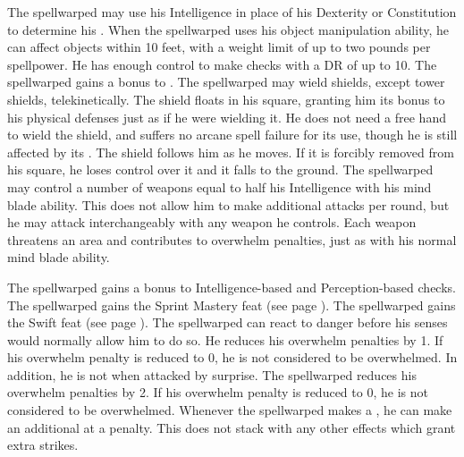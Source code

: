         The spellwarped may use his Intelligence in place of his Dexterity or Constitution to determine his .
        When the spellwarped uses his object manipulation ability, he can affect objects within 10 feet, with a weight limit of up to two pounds per spellpower.
        He has enough control to make checks with a DR of up to 10.
        The spellwarped gains a  bonus to .
        The spellwarped may wield shields, except tower shields, telekinetically.
        The shield floats in his square, granting him its bonus to his physical defenses just as if he were wielding it.
        He does not need a free hand to wield the shield, and suffers no arcane spell failure for its use, though he is still affected by its .
        The shield follows him as he moves.
        If it is forcibly removed from his square, he loses control over it and it falls to the ground.
        The spellwarped may control a number of weapons equal to half his Intelligence with his mind blade ability.
        This does not allow him to make additional attacks per round, but he may attack interchangeably with any weapon he controls.
        Each weapon threatens an area and contributes to overwhelm penalties, just as with his normal mind blade ability.

        The spellwarped gains a  bonus to Intelligence-based and Perception-based checks.
        The spellwarped gains the Sprint Mastery feat (see page ).
        The spellwarped gains the Swift feat (see page ).
        The spellwarped can react to danger before his senses would normally allow him to do so.
        He reduces his overwhelm penalties by 1.
        If his overwhelm penalty is reduced to 0, he is not considered to be overwhelmed.
        In addition, he is not \unaware when attacked by surprise.
        The spellwarped reduces his overwhelm penalties by 2.
        If his overwhelm penalty is reduced to 0, he is not considered to be overwhelmed.
        Whenever the spellwarped makes a , he can make an additional  at a  penalty.
        This does not stack with any other effects which grant extra strikes.

